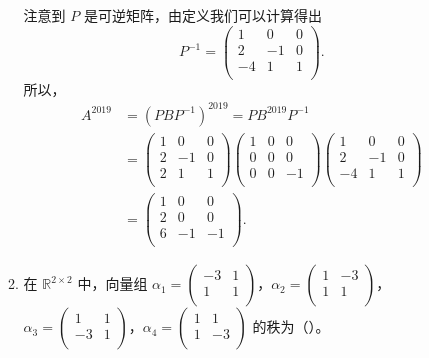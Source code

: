 \begin{enumerate}[1~]
\begin{enumerate}[1.~]
\begin{solution}
注意到 $P$ 是可逆矩阵，由定义我们可以计算得出
\[
P^{-1}=\left( \begin{matrix}
	1&		0&		0\\
	2&		-1&		0\\
	-4&		1&		1\\
\end{matrix} \right) .
\]
所以，
\begin{align*}
A^{2019}&=(PBP^{-1})^{2019}=PB^{2019}P^{-1}\\
&=\left( \begin{matrix}
	1&		0&		0\\
	2&		-1&		0\\
	2&		1&		1\\
\end{matrix} \right) \left( \begin{matrix}
	1&		0&		0\\
	0&		0&		0\\
	0&		0&		-1\\
\end{matrix} \right) \left( \begin{matrix}
	1&		0&		0\\
	2&		-1&		0\\
	-4&		1&		1\\
\end{matrix} \right)\\
&=\left( \begin{matrix}
	1&		0&		0\\
	2&		0&		0\\
	6&		-1&		-1\\
\end{matrix} \right).
\end{align*}
\end{solution}

\item
在 $\mathbb{R}^{2\times 2}$ 中，向量组 $\alpha_1=\left( \begin{smallmatrix}
	-3&		1\\
	1&		1\\
\end{smallmatrix} \right)$，$\alpha_2=\left( \begin{smallmatrix}
	1&		-3\\
	1&		1\\
\end{smallmatrix} \right) $，$\alpha_3=\left( \begin{smallmatrix}
	1&		1\\
	-3&		1\\
\end{smallmatrix} \right) $，$\alpha_4=\left( \begin{smallmatrix}
	1&		1\\
	1&		-3\\
\end{smallmatrix} \right) $ 的秩为（\quad）。
\begin{solution}

\end{solution}
\end{enumerate}
\end{enumerate}
\endinput